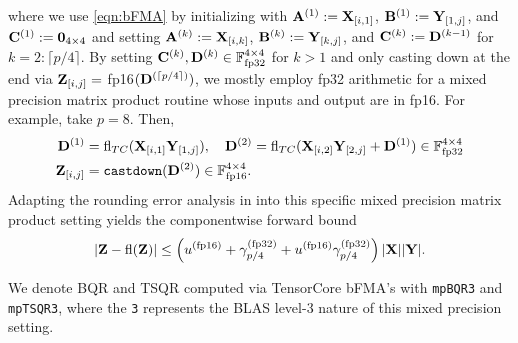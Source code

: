 where we use \cref{eqn:bFMA} by initializing with $\mathbf{A}^{(1)}:= \mathbf{X}_{[i,1]}$, $\mathbf{B}^{(1)}:= \mathbf{Y}_{[1,j]}$, and $\mathbf{C}^{(1)}:= \mathbf{0}_{4\times 4}$ and setting $\mathbf{A}^{(k)}:= \mathbf{X}_{[i,k]}$, $\mathbf{B}^{(k)}:= \mathbf{Y}_{[k,j]}$, and $\mathbf{C}^{(k)}:= \mathbf{D}^{(k-1)}$ for $k=2:\lceil p/4\rceil$.
By setting $\mathbf{C}^{(k)}, \mathbf{D}^{(k)}\in\mathbb{F}_{\text{fp32}}^{4\times 4}$ for $k>1$ and only casting down at the end via $\mathbf{Z}_{[i,j]} =$ fp16$(\mathbf{D}^{(\lceil p/4\rceil)})$, we mostly employ fp32 arithmetic for a mixed precision matrix product routine whose inputs and output are in fp16.
For example, take $p=8$.
Then,
\begin{align*}
\mathbf{D}^{(1)} &= \mathrm{fl}_{TC}(\mathbf{X}_{[i,1]} \mathbf{Y}_{[1,j]}),\quad\mathbf{D}^{(2)} = \mathrm{fl}_{TC}(\mathbf{X}_{[i,2]} \mathbf{Y}_{[2,j]} + \mathbf{D}^{(1)})\in\mathbb{F}_{\text{fp32}}^{4\times 4}\\
\mathbf{Z}_{[i,j]} &= \text{\tt castdown}(\mathbf{D}^{(2)})\in\mathbb{F}_{\text{fp16}}^{4\times 4}.
\end{align*}
Adapting the rounding error analysis in \cite{Blanchard2019} into this specific mixed precision matrix product setting yields the componentwise forward bound 
\begin{equation}
|\bb{Z}-\fl(\bb{Z})| \leq \left(u^{(\text{fp16})}+ \gamma_{p/4}^{(\text{fp32})}+u^{(\text{fp16})} \gamma_{p/4}^{(\text{fp32})}\right)|\bb{X}||\bb{Y}|.\label{eqn:bFMAerr}
\end{equation}

We denote BQR and TSQR computed via TensorCore bFMA's with {\tt mpBQR3} and {\tt mpTSQR3}, where the {\tt 3} represents the BLAS level-3 nature of this mixed precision setting.
